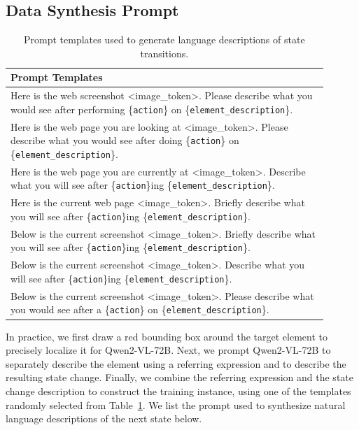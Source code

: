 \subsection{Data Synthesis Prompt}


\begin{table}[tbh]
\centering
\small
\begin{tabular}{p{0.90\linewidth}}
\toprule
\textbf{Prompt Templates} \\
\midrule
Here is the web screenshot <image\_token>. Please describe what you would see after performing \{\texttt{action}\} on \{\texttt{element\_description}\}. \\ \midrule
Here is the web page you are looking at <image\_token>. Please describe what you would see after doing \{\texttt{action}\} on \{\texttt{element\_description}\}. \\ \midrule
Here is the web page you are currently at <image\_token>. Describe what you will see after \{\texttt{action}\}ing \{\texttt{element\_description}\}. \\ \midrule
Here is the current web page <image\_token>. Briefly describe what you will see after \{\texttt{action}\}ing \{\texttt{element\_description}\}. \\ \midrule
Below is the current screenshot <image\_token>. Briefly describe what you will see after \{\texttt{action}\}ing \{\texttt{element\_description}\}. \\ \midrule
Below is the current screenshot <image\_token>. Describe what you will see after \{\texttt{action}\}ing \{\texttt{element\_description}\}. \\ \midrule
Below is the current screenshot <image\_token>. Please describe what you would see after a \{\texttt{action}\} on \{\texttt{element\_description}\}. \\
\bottomrule
\end{tabular}
\caption{Prompt templates used to generate language descriptions of state transitions.}
\label{tab:prompt-templates}
\end{table}


In practice, we first draw a red bounding box around the target element to precisely localize it for Qwen2-VL-72B.
Next, we prompt Qwen2-VL-72B to separately describe the element using a referring expression and to describe the resulting state change.
Finally, we combine the referring expression and the state change description to construct the training instance, using one of the templates randomly selected from Table~\ref{tab:prompt-templates}.
We list the prompt used to synthesize natural language descriptions of the next state below.

